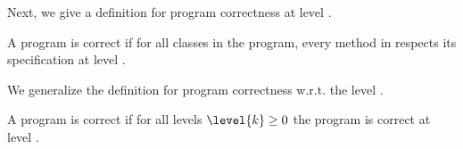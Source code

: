 Next, we give a definition for program correctness at level . 

\begin{defCorrect}\label{defCorrectProgramLevel}
A program is correct if for all classes \class{} in the program, every method \methodd{} in \class{}
respects its specification at level .
\end{defCorrect}



We generalize the definition for program correctness w.r.t. the level . 

\begin{defCorrect}\label{defCorrectProgram}
A program is correct
if for all levels $\level{k} \ge 0 $ the program is correct at level .
\end{defCorrect}



